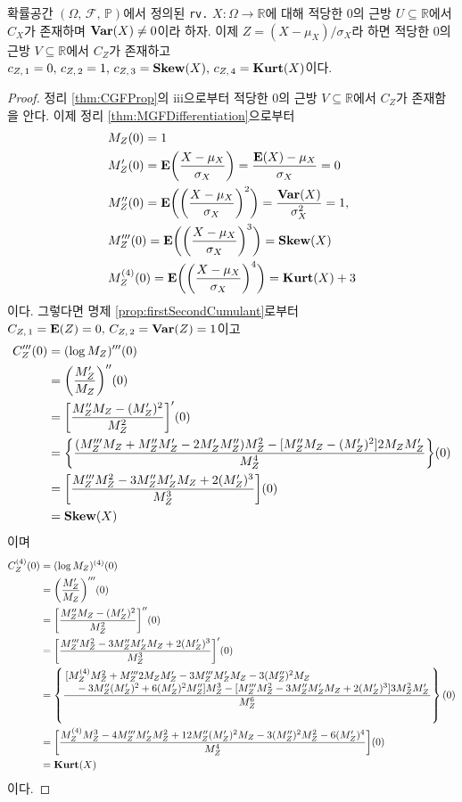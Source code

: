 \begin{proposition}
    확률공간 $(\Omega,\,\mathcal{F},\,\mathbb{P})$에서 정의된 \texttt{rv.} $X:\Omega\to\mathbb{R}$에 대해 적당한 $0$의 근방 $U\subseteq\mathbb{R}$에서 $C_X$가 존재하며 $\mathbf{Var}(X)\ne0$이라 하자. 이제 $Z=(X-\mu_X)/\sigma_X$라 하면 적당한 $0$의 근방 $V\subseteq\mathbb{R}$에서 $C_Z$가 존재하고 $c_{Z,\,1}=0,\,c_{Z,\,2}=1,\,c_{Z,\,3}=\mathbf{Skew}(X),\,c_{Z,\,4}=\mathbf{Kurt}(X)$이다.
\end{proposition}

\begin{proof}
    정리 \ref{thm:CGFProp}의 iii으로부터 적당한 $0$의 근방 $V\subseteq\mathbb{R}$에서 $C_Z$가 존재함을 안다. 이제 정리 \ref{thm:MGFDifferentiation}으로부터
    \begin{align*}
        &M_Z(0)=1\\
        &M_Z'(0)=\mathbf{E}\bigg(\frac{X-\mu_X}{\sigma_X}\bigg)=\frac{\mathbf{E}(X)-\mu_X}{\sigma_X}=0\\
        &M_Z''(0)=\mathbf{E}\bigg(\bigg(\frac{X-\mu_X}{\sigma_X}\bigg)^2\bigg)=\frac{\mathbf{Var}(X)}{\sigma_X^2}=1,\\
        &M_Z'''(0)=\mathbf{E}\bigg(\bigg(\frac{X-\mu_X}{\sigma_X}\bigg)^3\bigg)=\mathbf{Skew}(X)\\
        &M_Z^{(4)}(0)=\mathbf{E}\bigg(\bigg(\frac{X-\mu_X}{\sigma_X}\bigg)^4\bigg)=\mathbf{Kurt}(X)+3
    \end{align*}
    이다. 그렇다면 명제 \ref{prop:firstSecondCumulant}로부터 $C_{Z,\,1}=\mathbf{E}(Z)=0,\,C_{Z,\,2}=\mathbf{Var}(Z)=1$이고
    \begin{align*}
        C_Z'''(0)&=(\log M_Z)'''(0)\\
        &=\bigg(\frac{M_Z'}{M_Z}\bigg)''(0)\\
        &=\bigg[\frac{M_Z''M_Z-(M_Z')^2}{M_Z^2}\bigg]'(0)\\
        &=\bigg\{\frac{(M_Z'''M_Z+M_Z''M_Z'-2M_Z'M_Z'')M_Z^2-[M_Z''M_Z-(M_Z')^2]2M_ZM_Z'}{M_Z^4}\bigg\}(0)\\
        &=\bigg[\frac{M_Z'''M_Z^2-3M_Z''M_Z'M_Z+2(M_Z')^3}{M_Z^3}\bigg](0)\\
        &=\mathbf{Skew}(X)
    \end{align*}
    이며
    \begin{align*}
        C_Z^{(4)}(0)&=(\log M_Z)^{(4)}(0)\\
        &=\bigg(\frac{M_Z'}{M_Z}\bigg)'''(0)\\
        &=\bigg[\frac{M_Z''M_Z-(M_Z')^2}{M_Z^2}\bigg]''(0)\\
        &=\bigg[\frac{M_Z'''M_Z^2-3M_Z''M_Z'M_Z+2(M_Z')^3}{M_Z^3}\bigg]'(0)\\
        &=\left\{\frac{\splitfrac{[M_Z^{(4)}M_Z^2+M_Z'''2M_ZM_Z'-3M_Z'''M_Z'M_Z-3(M_Z'')^2M_Z}{-3M_Z''(M_Z')^2+6(M_Z')^2M_Z'']M_Z^3-[M_Z'''M_Z^2-3M_Z''M_Z'M_Z+2(M_Z')^3]3M_Z^2M_Z'}}{M_Z^6}\right\}(0)\\
        &=\bigg[\frac{M_Z^{(4)}M_Z^3-4M_Z'''M_Z'M_Z^2+12M_Z''(M_Z')^2M_Z-3(M_Z'')^2M_Z^2-6(M_Z')^4}{M_Z^4}\bigg](0)\\
        &=\kurt(X)
    \end{align*}
    이다.
\end{proof}

